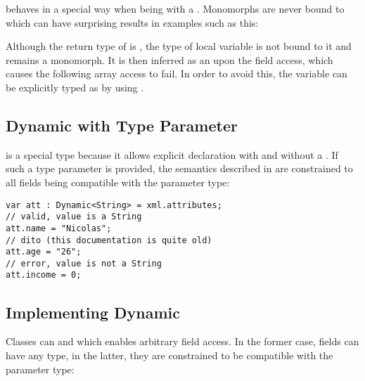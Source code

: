  behaves in a special way when being  with a . Monomorphs are never bound to  which can have surprising results in examples such as this:


Although the return type of  is , the type of local variable  is not bound to it and remains a monomorph. It is then inferred as an  upon the  field access, which causes the following  array access to fail. In order to avoid this, the variable  can be explicitly typed as  by using .


\subsection{Dynamic with Type Parameter}
\label{types-dynamic-with-type-parameter}

 is a special type because it allows explicit declaration with and without a . If such a type parameter is provided, the semantics described in  are constrained to all fields being compatible with the parameter type:

\begin{lstlisting}
var att : Dynamic<String> = xml.attributes;
// valid, value is a String
att.name = "Nicolas";
// dito (this documentation is quite old)
att.age = "26";
// error, value is not a String
att.income = 0;
\end{lstlisting}


\subsection{Implementing Dynamic}
\label{types-dynamic-implemented}

Classes can   and  which enables arbitrary field access. In the former case, fields can have any type, in the latter, they are constrained to be compatible with the parameter type:

